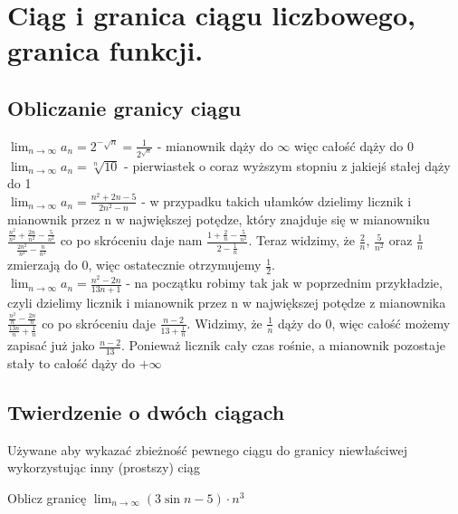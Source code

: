 \documentclass[12pt]{article}
\begin{document}
    \newpage

    \section{Ciąg i granica ciągu liczbowego, granica funkcji.}

    \subsection{Obliczanie granicy ciągu}
    $\lim_{n \to \infty} a_{n} = 2^{-\sqrt{n}} = \frac{1}{2^{\sqrt{n}}}$ - mianownik dąży do $\infty$ więc całość dąży do 0 \\

    \noindent $\lim_{n \to \infty} a_{n} = \sqrt[n]{10}$ - pierwiastek o coraz wyższym stopniu z jakiejś stałej dąży do 1 \\

    \noindent $\lim_{n \to \infty} a_{n} = \frac{n^{2} + 2n - 5}{2n^{2} - n}$ - w przypadku takich ułamków dzielimy licznik i mianownik przez n w największej potędze, który znajduje się w mianowniku
    $\frac{\frac{n^{2}}{n^{2}} + \frac{2n}{n^{2}} - \frac{5}{n^{2}}} {\frac{2n^{2}}{n^{2}} - \frac{n}{n^{2}}}$ co po skróceniu daje nam $\frac{1 + \frac{2}{n} - \frac{5}{n^{2}}} {2 - \frac{1}{n}}$.
    Teraz widzimy, że $\frac{2}{n}$, $\frac{5}{n^{2}}$ oraz $\frac{1}{n}$ zmierzają do 0, więc ostatecznie otrzymujemy $\frac{1}{2}$. \\

    \noindent $\lim_{n \to \infty} a_{n} = \frac{n^{2} - 2n}{13n + 1}$ - na początku robimy tak jak w poprzednim przykładzie, czyli dzielimy licznik i mianownik przez n w największej potędze z mianownika
    $\frac{\frac{n^{2}}{n} - \frac{2n}{n}} {\frac{13n}{n} + \frac{1}{n}}$ co po skróceniu daje $\frac{n - 2}{13 + \frac{1}{n}}$. Widzimy, że $\frac{1}{n}$ dąży do 0, więc całość możemy zapisać już jako
    $\frac{n - 2}{13}$. Ponieważ licznik cały czas rośnie, a mianownik pozostaje stały to całość dąży do $+\infty$


	\subsection{Twierdzenie o dwóch ciągach}

	Używane aby wykazać zbieżność pewnego ciągu do granicy niewłaściwej wykorzystując inny (prostszy) ciąg \\

	\begin{exercise}
		Oblicz granicę $\lim_{n \to \infty} (3 \sin{n} - 5) \cdot n^{3}$ \\
	\end{exercise}
\end{document}
